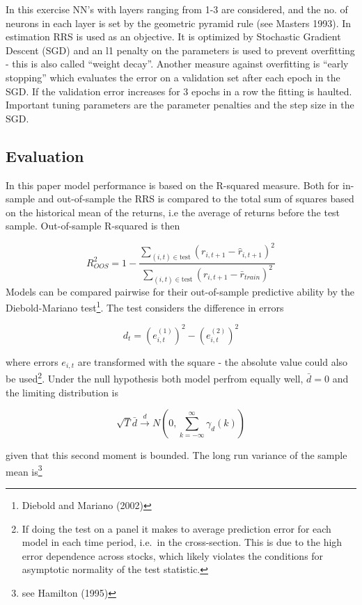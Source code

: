 \documentclass[]{article}
\let\rmarkdownfootnote\footnote%
\def\footnote{\protect\rmarkdownfootnote}
\begin{document}
In this exercise NN's with layers ranging from 1-3 are considered, and
the no. of neurons in each layer is set by the geometric pyramid rule
(see Masters 1993). In estimation RRS is used as an objective. It is
optimized by Stochastic Gradient Descent (SGD) and an l1 penalty on the
parameters is used to prevent overfitting - this is also called ``weight
decay''. Another measure against overfitting is ``early stopping'' which
evaluates the error on a validation set after each epoch in the SGD. If
the validation error increases for 3 epochs in a row the fitting is
haulted. Important tuning parameters are the parameter penalties and the
step size in the SGD.

\hypertarget{evaluation}{%
\subsection{Evaluation}\label{evaluation}}

In this paper model performance is based on the R-squared measure. Both
for in-sample and out-of-sample the RRS is compared to the total sum of
squares based on the historical mean of the returns, i.e the average of
returns before the test sample. Out-of-sample R-squared is then

\[
R^2_{OOS} = 1 - \frac{\sum_{(i,t)\in\mathrm{test}} (r_{i,t+1} - \hat{r}_{i,t+1} )^2}{\sum_{(i,t)\in\mathrm{test}} (r_{i,t+1}- \bar{r}_{train})^2 }
\] Models can be compared pairwise for their out-of-sample predictive
ability by the Diebold-Mariano test\footnote{Diebold and Mariano (2002)}.
The test considers the difference in errors

\[d_t = \left(e_{i,t}^{(1)}\right)^2 - \left(e_{i,t}^{(2)}\right)^2\]

where errors \(e_{i,t}\) are transformed with the square - the absolute
value could also be used\footnote{If doing the test on a panel it makes
  to average prediction error for each model in each time period,
  i.e.~in the cross-section. This is due to the high error dependence
  across stocks, which likely violates the conditions for asymptotic
  normality of the test statistic.}. Under the null hypothesis both
model perfrom equally well, \(\bar{d}= 0\) and the limiting distribution
is

\[\sqrt{T}\bar{d} \xrightarrow[]{d} N\left(0, \sum_{k=-\infty}^{\infty} \gamma_d(k)\right)\]

given that this second moment is bounded. The long run variance of the
sample mean is\footnote{see Hamilton (1995)}
\end{document}
